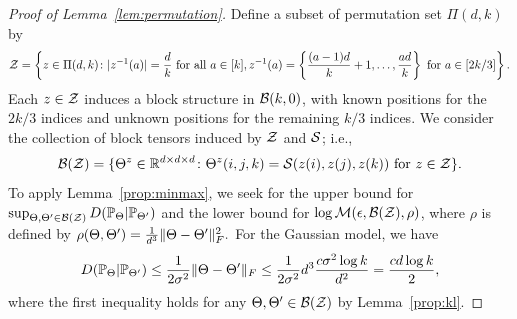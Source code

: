 \documentclass[12pt]{article}
\theoremstyle{definition}
\begin{document}
\begin{proof}[Proof of Lemma~\ref{lem:permutation}]
Define a subset of permutation set $\Pi(d,k)$ by
\begin{align}
    \mathcal{Z} = \left\{z\in \Pi(d,k)\colon |z^{-1}(a)| = \frac{d}{k} \text{ for all } a\in[k], z^{-1}(a) = \left\{\frac{(a-1)d}{k}+1,\ldots,\frac{ad}{k}\right\}  \text{ for } a\in[2k/3] \right\}.
\end{align}
Each $z\in\mathcal{Z}$ induces a block structure in $\mathcal{B}(k,0)$, with known positions for the $2k/3$ indices and unknown positions for the remaining $k/3$ indices. We consider the collection of block tensors induced by $\mathcal{Z}$ and $\mathcal{S}$; i.e.,
\begin{align}
    \mathcal{B}(\mathcal{Z}) = \{\Theta^z\in\mathbb{R}^{d\times d\times d}\colon \Theta^z(i,j,k) = \mathcal{S}(z(i),z(j),z(k)) \text{ for } z\in\mathcal{Z}\}.
\end{align}
To apply Lemma~\ref{prop:minmax}, we seek for the upper bound for $\sup_{\Theta,\Theta'\in\mathcal{B}(\mathcal{Z})}D(\mathbb{P}_\Theta|\mathbb{P}_{\Theta'})$ and the lower bound for $\log \mathcal{M}(\epsilon,\mathcal{B}(\mathcal{Z}),\rho)$, where $\rho$ is defined by 
$\rho(\Theta,\Theta') = \frac{1}{d^3}\lVert\Theta-\Theta'\rVert_F^2.$
For the Gaussian model, we have
\begin{align}\label{eq:kldistance}
    D(\mathbb{P}_\Theta|\mathbb{P}_{\Theta'})\leq \frac{1}{2\sigma^2}\lVert\Theta-\Theta'\rVert_F\leq \frac{1}{2\sigma^2}d^3 \frac{c\sigma^2\log k}{d^2}=\frac{cd\log k}{2},
\end{align}where the first inequality holds for any $\Theta,\Theta'\in\mathcal{B}(\mathcal{Z})$ by Lemma~\ref{prop:kl}. 


\end{proof}
\end{document}
